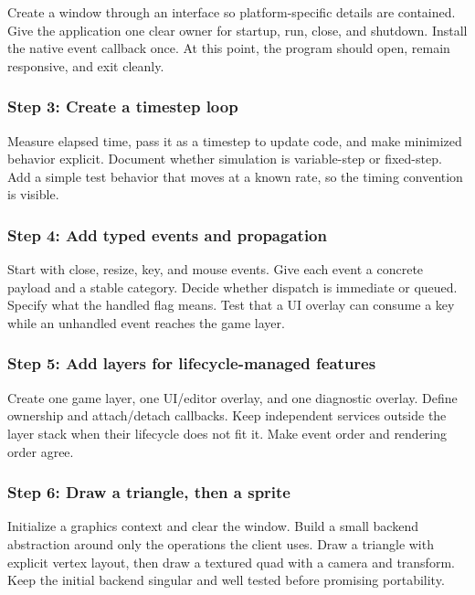 Create a window through an interface so platform-specific details are contained. Give the application one clear owner for startup, run, close, and shutdown. Install the native event callback once. At this point, the program should open, remain responsive, and exit cleanly.

\subsubsection{Step 3: Create a timestep loop}\label{06-engine-ii-ch042-step-3-create-a-timestep-loop}

Measure elapsed time, pass it as a timestep to update code, and make minimized behavior explicit. Document whether simulation is variable-step or fixed-step. Add a simple test behavior that moves at a known rate, so the timing convention is visible.

\subsubsection{Step 4: Add typed events and propagation}\label{06-engine-ii-ch042-step-4-add-typed-events-and-propagation}

Start with close, resize, key, and mouse events. Give each event a concrete payload and a stable category. Decide whether dispatch is immediate or queued. Specify what the handled flag means. Test that a UI overlay can consume a key while an unhandled event reaches the game layer.

\subsubsection{Step 5: Add layers for lifecycle-managed features}\label{06-engine-ii-ch042-step-5-add-layers-for-lifecycle-managed-features}

Create one game layer, one UI/editor overlay, and one diagnostic overlay. Define ownership and attach/detach callbacks. Keep independent services outside the layer stack when their lifecycle does not fit it. Make event order and rendering order agree.

\subsubsection{Step 6: Draw a triangle, then a sprite}\label{06-engine-ii-ch042-step-6-draw-a-triangle-then-a-sprite}

Initialize a graphics context and clear the window. Build a small backend abstraction around only the operations the client uses. Draw a triangle with explicit vertex layout, then draw a textured quad with a camera and transform. Keep the initial backend singular and well tested before promising portability.

